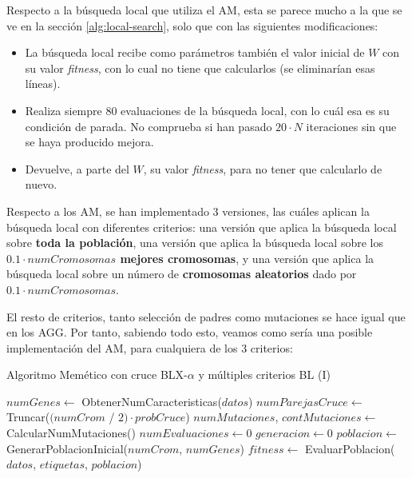 \documentclass[11pt,a4paper]{article}
\begin{document}
Respecto a la búsqueda local que utiliza el AM, esta se parece mucho a la que se ve en la sección \ref{alg:local-search},
solo que con las siguientes modificaciones:

\begin{itemize}[label=\textbullet]
	\item La búsqueda local recibe como parámetros también el valor inicial de $W$ con su valor \textit{fitness}, con lo
	cual no tiene que calcularlos (se eliminarían esas líneas).
	\item Realiza siempre 80 evaluaciones de la búsqueda local, con lo cuál esa es su condición de parada. No comprueba
	si han pasado $20 \cdot N$ iteraciones sin que se haya producido mejora.
	\item Devuelve, a parte del $W$, su valor \textit{fitness}, para no tener que calcularlo de nuevo.
\end{itemize}

Respecto a los AM, se han implementado 3 versiones, las cuáles aplican la búsqueda local con diferentes criterios: una versión
que aplica la búsqueda local sobre \textbf{toda la población}, una versión que aplica la búsqueda local sobre los
\textbf{$0.1 \cdot numCromosomas$ mejores cromosomas}, y una versión que aplica la búsqueda local sobre un número de 
\textbf{cromosomas aleatorios} dado por $0.1 \cdot numCromosomas$.

El resto de criterios, tanto selección de padres como mutaciones se hace igual que en los AGG. Por tanto, sabiendo todo esto,
veamos como sería una posible implementación del AM, para cualquiera de los 3 criterios:

\begin{algorithm}[H]
\caption{Algoritmo Memético con cruce BLX-$\alpha$ y múltiples criterios BL (I)}
\begin{algorithmic}[1]
\State $numGenes \gets$ ObtenerNumCaracteristicas($datos$)
\State $numParejasCruce \gets$ Truncar($(numCrom$ / $2) \cdot probCruce$)
\State $numMutaciones$, $contMutaciones \gets $ CalcularNumMutaciones()
\State $numEvaluaciones \gets 0$
\State $generacion \gets 0$
\State $poblacion \gets$ GenerarPoblacionInicial($numCrom$, $numGenes$)
\State $fitness \gets$ EvaluarPoblacion($datos$, $etiquetas$, $poblacion$)
\end{algorithmic}
\end{algorithm}
\end{document}

